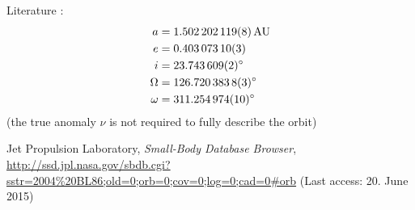 \documentclass[11pt, a4paper]{article}
\numberwithin{equation}{section}
\begin{document}
Literature \cite{JPL}:
\begin{align*}
	a &= \SI{1.502202119 +- 0.000000008}{AU} \\
	e &= \num{0.40307310 +-0.00000003} \\
	i &= \SI{23.743609 +- 0.000002}{\degree} \\
	\Omega &= \SI{126.7203838 +- 0.0000003}{\degree} \\
	\omega &= \SI{311.254974 +- 0.000010}{\degree} \\
\end{align*}
(the true anomaly $\nu$ is not required to fully describe the orbit)


\FloatBarrier
\vspace{\fill}
\begin{thebibliography}{19}
	
	Jet Propulsion Laboratory,
	\emph{Small-Body Database Browser},\\
	\url{http://ssd.jpl.nasa.gov/sbdb.cgi?sstr=2004%20BL86;old=0;orb=0;cov=0;log=0;cad=0#orb} (Last access: 20. June 2015)
\end{thebibliography}

\end{document}
